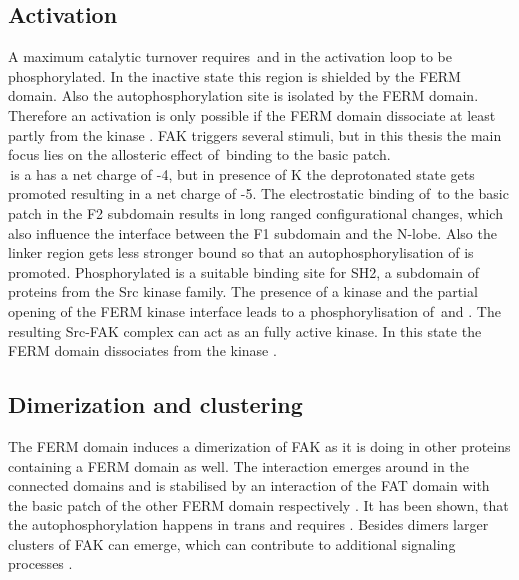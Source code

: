 \subsection{Activation}
A maximum catalytic turnover requires \,and  in the activation loop to be phosphorylated. In the inactive state this region is shielded by the FERM domain. Also the autophosphorylation site  is isolated by the FERM domain. Therefore an activation is only possible if the FERM domain dissociate at least partly from the kinase \autocite{structFAK}. FAK triggers several stimuli, but in this thesis the main focus lies on the allosteric effect of \pip\,binding to the basic patch.\\
\pip\,is a has a net charge of -4, but in presence of K the deprotonated state gets promoted resulting in a net charge of -5. The electrostatic binding of \pip\,to the basic patch in the F2 subdomain results in long ranged configurational changes, which also influence the interface between the F1 subdomain and the N-lobe. Also the linker region gets less stronger bound so that an autophosphorylisation of  is promoted. Phosphorylated  is a suitable binding site for SH2, a subdomain of proteins from the Src kinase family. The presence of a kinase and the partial opening of the FERM kinase interface leads to a phosphorylisation of \,and . The resulting Src-FAK complex can act as an fully active kinase. In this state the FERM domain dissociates from the kinase \autocites{pap003}{pap001}.
\subsection{Dimerization and clustering}
The FERM domain induces a dimerization of FAK as it is doing in other proteins containing a FERM domain as well. The interaction emerges around  in the connected domains and is stabilised by an interaction of the FAT domain with the basic patch of the other FERM domain respectively \autocite{fakdimers}. It has been shown, that the autophosphorylation happens in trans \autocite{transAuto} and requires  \autocite{fakdimers}. Besides dimers larger clusters of FAK can emerge, which can contribute to additional signaling processes \autocite{dimersVsClusters}.
